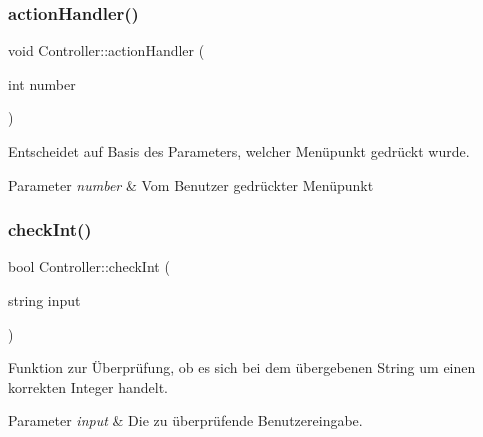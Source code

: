 \subsubsection{\texorpdfstring{action\+Handler()}{actionHandler()}}
{\footnotesize\ttfamily void Controller\+::action\+Handler (\begin{DoxyParamCaption}\item[{int}]{number }\end{DoxyParamCaption})}



Entscheidet auf Basis des Parameters, welcher Menüpunkt gedrückt wurde.


\begin{DoxyParams}{Parameter}
{\em number} & Vom Benutzer gedrückter Menüpunkt\\
\hline
\end{DoxyParams}
\mbox{\label{classContactManager_1_1Controller_a9228c2d2d075707af32f9cceded67566}} 
\subsubsection{\texorpdfstring{check\+Int()}{checkInt()}\hspace{0.1cm}{\footnotesize\ttfamily [1/2]}}
{\footnotesize\ttfamily bool Controller\+::check\+Int (\begin{DoxyParamCaption}\item[{string}]{input }\end{DoxyParamCaption})\hspace{0.3cm}{\ttfamily [static]}}



Funktion zur Überprüfung, ob es sich bei dem übergebenen String um einen korrekten Integer handelt.


\begin{DoxyParams}{Parameter}
{\em input} & Die zu überprüfende Benutzereingabe.\\
\hline
\end{DoxyParams}
\mbox{\label{classContactManager_1_1Controller_a4d7439dbaddaefd7a8ef91d50ce226e9}} 
